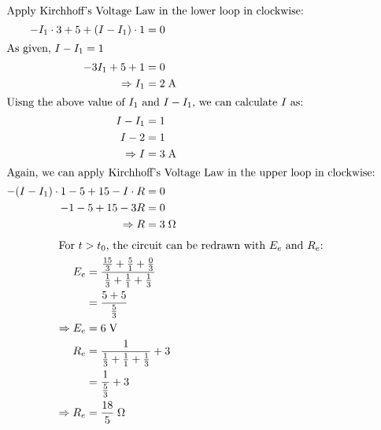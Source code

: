 \begin{solution}
\begin{center}
    \end{center}
    \begin{align*}
        \intertext{Apply Kirchhoff's Voltage Law in the lower loop in clockwise:}
        -I_1 \cdot 3 + 5 + (I-I_1)\cdot 1 &= 0\\
        \intertext{As given, $I-I_1=1$}
        -3I_1 + 5 + 1 &= 0\\
        \Rightarrow I_1 &= 2 \; \text{A}\\
        \intertext{Uisng the above value of $I_1$ and $I-I_1$, we can calculate $I$ as:}
        I-I_1 &= 1\\
        I -2 &= 1\\
        \Rightarrow I &= 3 \; \text{A}\\
        \intertext{Again, we can apply Kirchhoff's Voltage Law in the upper loop in clockwise:}
        -(I-I_1) \cdot 1 - 5 + 15 -I\cdot R &= 0\\
        -1 - 5 + 15 - 3R &= 0\\
        \Rightarrow R &= 3 \; \Omega
    \end{align*}
    \begin{align*}
        \intertext{For \( t > t_0 \), the circuit can be redrawn with $E_e$ and $R_e$:}
        E_e &= \frac{\frac{15}{3} + \frac{5}{1} + \frac{0}{3}}{\frac{1}{3} + \frac{1}{1} + \frac{1}{3}}\\
        &= \frac{5+5}{\frac{5}{3}}\\
        \Rightarrow E_e &= 6 \; \text{V}\\
        R_e &= \frac{1}{\frac{1}{3} + \frac{1}{1} + \frac{1}{3}} + 3\\
        &= \frac{1}{\frac{5}{3}} + 3\\
        \Rightarrow R_e &= \frac{18}{5} \; \Omega
    \end{align*} 
    \begin{center}
\end{center}
\end{solution}
